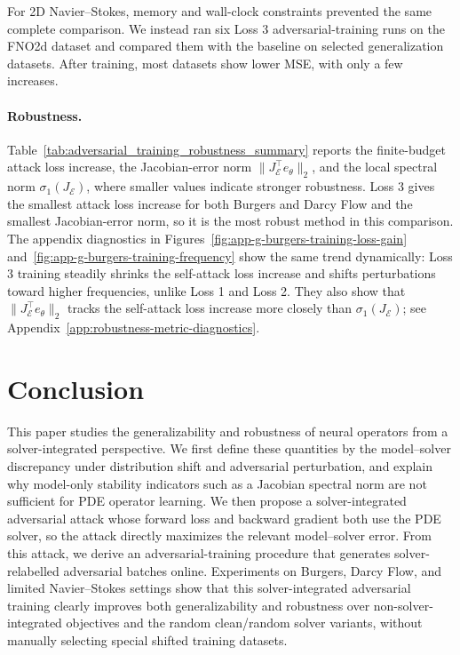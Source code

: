 \documentclass[letterpaper]{article} %
\newcommand{\figrefs}[2]{Figures~\ref{#1} and~\ref{#2}}
\newcommand{\tabref}[1]{Table~\ref{#1}}
\newcommand{\appref}[1]{Appendix~\ref{#1}}
\begin{document}
For 2D Navier--Stokes, memory and wall-clock constraints prevented the same
complete comparison. We instead ran six Loss 3 adversarial-training runs on the
FNO2d dataset and compared them with the baseline on selected generalization
datasets. After training, most datasets show lower MSE, with only a few
increases.

\paragraph{Robustness.}
\tabref{tab:adversarial_training_robustness_summary} reports the finite-budget
attack loss increase, the Jacobian-error norm
\(\|J_{\mathcal E}^{\top}e_\theta\|_2\), and the local spectral norm
\(\sigma_1(J_{\mathcal E})\), where smaller values indicate stronger
robustness.  Loss 3 gives the smallest attack loss increase for both Burgers
and Darcy Flow and the smallest Jacobian-error norm, so it is the most robust
method in this comparison.  The appendix diagnostics in
\figrefs{fig:app-g-burgers-training-loss-gain}{fig:app-g-burgers-training-frequency}
show the same trend dynamically: Loss 3 training steadily shrinks the
self-attack loss increase and shifts perturbations toward higher frequencies,
unlike Loss 1 and Loss 2.  They also show that
\(\|J_{\mathcal E}^{\top}e_\theta\|_2\) tracks the self-attack loss increase
more closely than \(\sigma_1(J_{\mathcal E})\); see
\appref{app:robustness-metric-diagnostics}.

\section{Conclusion}

This paper studies the generalizability and robustness of neural operators from
a solver-integrated perspective.  We first define these quantities by the
model--solver discrepancy under distribution shift and adversarial
perturbation, and explain why model-only stability indicators such as a
Jacobian spectral norm are not sufficient for PDE operator learning.  We then propose
a solver-integrated adversarial attack whose forward loss and backward gradient
both use the PDE solver, so the attack directly maximizes the relevant
model--solver error.  From this attack, we derive an adversarial-training
procedure that generates solver-relabelled adversarial batches online.
Experiments on Burgers, Darcy Flow, and limited Navier--Stokes settings show
that this solver-integrated adversarial training clearly improves both
generalizability and robustness over non-solver-integrated objectives and
the random clean/random solver variants, without manually selecting special
shifted training datasets.
\end{document}
